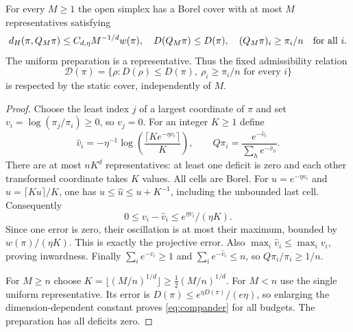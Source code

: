 \begin{lemma}\label{lem:masscompander}
For every $M\ge1$ the open simplex has a Borel cover with at most $M$ representatives satisfying
\begin{equation}\label{eq:compander}
 d_H(\pi,Q_M\pi)\le C_{d,\eta}M^{-1/d}w(\pi),\quad
 D(Q_M\pi)\le D(\pi),\quad
 (Q_M\pi)_i\ge\pi_i/n\quad\hbox{for all }i.
\end{equation}
The uniform preparation is a representative. Thus the fixed admissibility relation
\begin{equation}\label{eq:massrelation}
 \mathcal D(\pi)=\{\rho:D(\rho)\le D(\pi),\ \rho_i\ge\pi_i/n\text{ for every }i\}
\end{equation}
is respected by the static cover, independently of $M$.
\end{lemma}
\begin{proof}
Choose the least index $j$ of a largest coordinate of $\pi$ and set $v_i=\log(\pi_j/\pi_i)\ge0$, so $v_j=0$. For an integer $K\ge1$ define
\[
 \widehat v_i=-\eta^{-1}\log\left(\frac{\lceil K e^{-\eta v_i}\rceil}{K}\right),
 \qquad Q\pi_i=\frac{e^{-\widehat v_i}}{\sum_h e^{-\widehat v_h}}.
\]
There are at most $nK^d$ representatives: at least one deficit is zero and each other transformed coordinate takes $K$ values. All cells are Borel. For $u=e^{-\eta v_i}$ and $\widehat u=\lceil Ku\rceil/K$, one has $u\le\widehat u\le u+K^{-1}$, including the unbounded last cell. Consequently
\[
 0\le v_i-\widehat v_i\le e^{\eta v_i}/(\eta K).
\]
Since one error is zero, their oscillation is at most their maximum, bounded by $w(\pi)/(\eta K)$. This is exactly the projective error. Also $\max_i\widehat v_i\le\max_i v_i$, proving inwardness. Finally $\sum_i e^{-v_i}\ge1$ and $\sum_i e^{-\widehat v_i}\le n$, so $Q\pi_i/\pi_i\ge1/n$.

For $M\ge n$ choose $K=\lfloor(M/n)^{1/d}\rfloor\ge\tfrac12(M/n)^{1/d}$. For $M<n$ use the single uniform representative. Its error is $D(\pi)\le e^{\eta D(\pi)}/(e\eta)$, so enlarging the dimension-dependent constant proves \eqref{eq:compander} for all budgets. The preparation has all deficits zero.
\end{proof}

